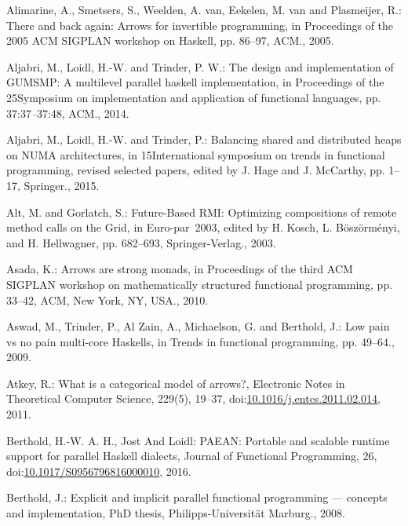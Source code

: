 \documentclass[paper=A4,twoside=true,openright,parskip=full,chapterprefix=true,headings=normal,bibliography=totoc,listof=totoc,titlepage=on,captions=tableabove,draft=false,british]{scrreprt}%
\begin{document}
\leavevmode\hypertarget{ref-Alimarine:2005:BAA:1088348.1088357}{}%
Alimarine, A., Smetsers, S., Weelden, A. van, Eekelen, M. van and
Plasmeijer, R.: There and back again: Arrows for invertible programming,
in Proceedings of the 2005 ACM SIGPLAN workshop on Haskell, pp. 86--97,
ACM., 2005.

\leavevmode\hypertarget{ref-Aljabri:2013:DIG:2620678.2620682}{}%
Aljabri, M., Loidl, H.-W. and Trinder, P. W.: The design and
implementation of GUMSMP: A multilevel parallel haskell implementation,
in Proceedings of the 25Symposium on implementation and application of
functional languages, pp. 37:37--37:48, ACM., 2014.

\leavevmode\hypertarget{ref-Aljabri2015}{}%
Aljabri, M., Loidl, H.-W. and Trinder, P.: Balancing shared and
distributed heaps on NUMA architectures, in 15International symposium on
trends in functional programming, revised selected papers, edited by J.
Hage and J. McCarthy, pp. 1--17, Springer., 2015.

\leavevmode\hypertarget{ref-AlGo03a}{}%
Alt, M. and Gorlatch, S.: Future-Based RMI: Optimizing compositions of
remote method calls on the Grid, in Euro-par~2003, edited by H. Kosch,
L. Böszörményi, and H. Hellwagner, pp. 682--693, Springer-Verlag., 2003.

\leavevmode\hypertarget{ref-Asada:2010:ASM:1863597.1863607}{}%
Asada, K.: Arrows are strong monads, in Proceedings of the third ACM
SIGPLAN workshop on mathematically structured functional programming,
pp. 33--42, ACM, New York, NY, USA., 2010.

\leavevmode\hypertarget{ref-aswad2009low}{}%
Aswad, M., Trinder, P., Al Zain, A., Michaelson, G. and Berthold, J.:
Low pain vs no pain multi-core Haskells, in Trends in functional
programming, pp. 49--64., 2009.

\leavevmode\hypertarget{ref-ATKEY201119}{}%
Atkey, R.: What is a categorical model of arrows?, Electronic Notes in
Theoretical Computer Science, 229(5), 19--37,
doi:\href{https://doi.org/10.1016/j.entcs.2011.02.014}{10.1016/j.entcs.2011.02.014},
2011.

\leavevmode\hypertarget{ref-berthold_loidl_hammond_2016}{}%
Berthold, H.-W. A. H., Jost And Loidl: PAEAN: Portable and scalable
runtime support for parallel Haskell dialects, Journal of Functional
Programming, 26,\\
doi:\href{https://doi.org/10.1017/S0956796816000010}{10.1017/S0956796816000010},
2016.

\leavevmode\hypertarget{ref-JostThesis}{}%
Berthold, J.: Explicit and implicit parallel functional programming ---
concepts and implementation, PhD thesis, Philipps-Universität Marburg.,
2008.
\end{document}
